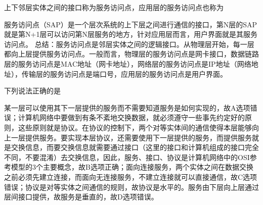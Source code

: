 \question 上下邻层实体之间的接口称为服务访问点，应用层的服务访问点也称为
\par{}
\begin{solution}服务访问点（SAP）是一个层次系统的上下层之间进行通信的接口，第N层的SAP就是第N+1层可以访问第N层服务的地方，针对应用层而言，用户界面就是其服务访问点。
总结：服务访问点是邻层实体之间的逻辑接口。从物理层开始，每一层都向上层提供服务访问点。一般而言，物理层的服务访问点是网卡接口，数据链路层的服务访问点是MAC地址（网卡地址），网络层的服务访问点是IP地址（网络地址），传输层的服务访问点是端口号，应用层的服务访问点是用户界面。
\end{solution}
\question 下列说法正确的是
\par{}
\begin{solution}某一层可以使用其下一层提供的服务而不需要知道服务是如何实现的，故A选项错误；计算机网络中要做到有条不紊地交换数据，就必须遵守一些事先约定好的原则，这些原则就是协议。在协议的控制下，两个对等实体间的通信使得本层能够向上一层提供服务。要实现本层协议，还需要使用下一层提供的服务，而提供服务就是交换信息，而要交换信息就需要通过接口（这里的接口和计算机组成的接口完全不同，不要混淆）去交换信息，因此，服务、接口、协议是计算机网络中的OSI参考模型的3个主要概念，故B选项正确；面向连接服务，两个实体之间在数据交换之前必须先建立连接，而面向无连接服务，不建立连接就可以直接通信，故C选项错误；协议是对等实体之间通信的规则，故协议是水平的。服务由下层向上层通过层间接口提供，故服务是垂直的，故D选项错误。
\end{solution}

